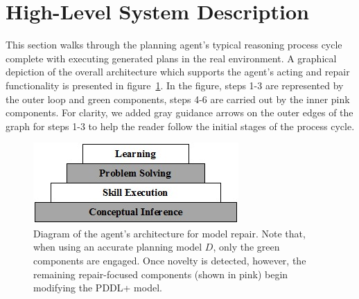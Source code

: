 \documentclass[letterpaper]{article} %
\begin{document}
\section{High-Level System Description}

This section walks through the planning agent's typical reasoning process cycle complete with executing generated plans in the real environment. A graphical depiction of the overall architecture which supports the agent's acting and repair functionality is presented in figure~\ref{fig:repair_architecture}. In the figure, steps 1-3 are represented by the outer loop and green components, steps 4-6 are carried out by the inner pink components. For clarity, we added gray guidance arrows on the outer edges of the graph for steps 1-3 to help the reader follow the initial stages of the process cycle.

\begin{figure}
\centering
\includegraphics[width=\columnwidth]{cascade.png}
\caption{Diagram of the agent's architecture for model repair. Note that, when using an accurate planning model $D$, only the green components are engaged. Once novelty is detected, however, the remaining repair-focused components (shown in pink) begin modifying the PDDL+ model.}
\label{fig:repair_architecture}
\end{figure}
\end{document}
